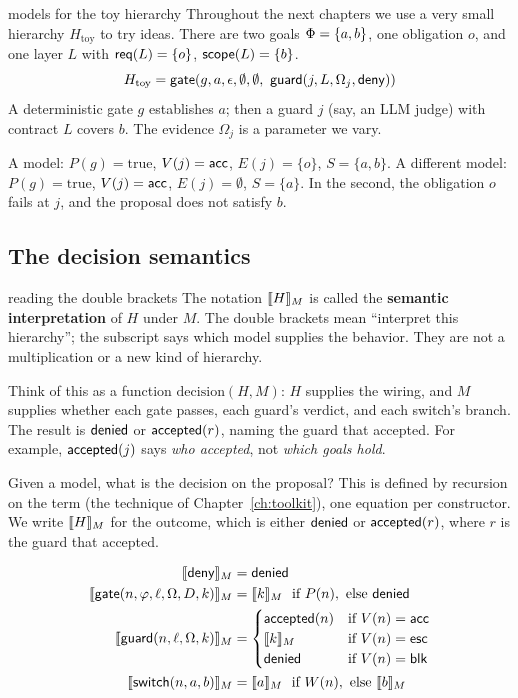 \begin{example}{models for the toy hierarchy}
Throughout the next chapters we use a very small hierarchy $H_{\mathrm{toy}}$ to try ideas. There are two goals $\Phi=\{a,b\}$, one obligation $o$, and one layer $L$ with $\mathsf{req}(L)=\{o\}$, $\mathsf{scope}(L)=\{b\}$.
\[
H_{\mathrm{toy}}=\gate(g,a,\epsilon,\emptyset,\emptyset,\ \guard(j,L,\Omega_j,\deny))
\]
A deterministic gate $g$ establishes $a$; then a guard $j$ (say, an LLM judge) with contract $L$ covers $b$. The evidence $\Omega_j$ is a parameter we vary.

A model: $P(g)=\text{true}$, $V(j)=\mathsf{acc}$, $E(j)=\{o\}$, $S=\{a,b\}$. A different model: $P(g)=\text{true}$, $V(j)=\mathsf{acc}$, $E(j)=\emptyset$, $S=\{a\}$. In the second, the obligation $o$ fails at $j$, and the proposal does not satisfy $b$.
\end{example}

\subsection{The decision semantics}
\label{sec:reading-semantics}

\begin{toolbox}{reading the double brackets}
The notation $\llbracket H\rrbracket_{M}$ is called the \textbf{semantic interpretation} of $H$ under $M$. The double brackets mean ``interpret this hierarchy''; the subscript says which model supplies the behavior. They are not a multiplication or a new kind of hierarchy.

Think of this as a function $\mathrm{decision}(H,M)$: $H$ supplies the wiring, and $M$ supplies whether each gate passes, each guard's verdict, and each switch's branch. The result is $\mathsf{denied}$ or $\mathsf{accepted}(r)$, naming the guard that accepted. For example, $\mathsf{accepted}(j)$ says \emph{who accepted}, not \emph{which goals hold}.
\end{toolbox}

Given a model, what is the decision on the proposal? This is defined by recursion on the term (the technique of Chapter~\ref{ch:toolkit}), one equation per constructor. We write $\llbracket H\rrbracket_{M}$ for the outcome, which is either $\mathsf{denied}$ or $\mathsf{accepted}(r)$, where $r$ is the guard that accepted.

\begin{align*}
\llbracket \mathsf{deny}\rrbracket_{M}&=\mathsf{denied}\\
\llbracket \mathsf{gate}(n,\varphi,\ell,\Omega,D,k)\rrbracket_{M}&=\llbracket k\rrbracket_{M}\ \text{ if }P(n),\ \text{else }\mathsf{denied}\\
\llbracket \mathsf{guard}(n,\ell,\Omega,k)\rrbracket_{M}&=\begin{cases}\mathsf{accepted}(n)&\text{if }V(n)=\mathsf{acc}\\\llbracket k\rrbracket_{M}&\text{if }V(n)=\mathsf{esc}\\\mathsf{denied}&\text{if }V(n)=\mathsf{blk}\end{cases}\\
\llbracket \mathsf{switch}(n,a,b)\rrbracket_{M}&=\llbracket a\rrbracket_{M}\ \text{ if }W(n),\ \text{else }\llbracket b\rrbracket_{M}
\end{align*}

